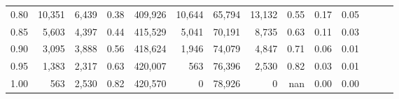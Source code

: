 \begin{tabular}{rrrrrrrrrrrrrr}
0.80 &  10,351 &  6,439 &  0.38 &  409,926 &   10,644 &  65,794 &  13,132 &  0.55 &  0.17 &      0.05 \\
0.85 &   5,603 &  4,397 &  0.44 &  415,529 &    5,041 &  70,191 &   8,735 &  0.63 &  0.11 &      0.03 \\
0.90 &   3,095 &  3,888 &  0.56 &  418,624 &    1,946 &  74,079 &   4,847 &  0.71 &  0.06 &      0.01 \\
0.95 &   1,383 &  2,317 &  0.63 &  420,007 &      563 &  76,396 &   2,530 &  0.82 &  0.03 &      0.01 \\
1.00 &     563 &  2,530 &  0.82 &  420,570 &        0 &  78,926 &       0 &   nan &  0.00 &      0.00 \\
\bottomrule
\end{tabular}
